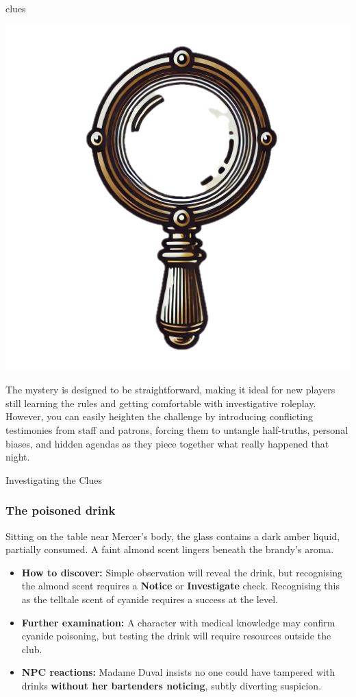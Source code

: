 \newcolumn
{clues}

\begin{center}
	\includegraphics[width=.5\linewidth]{img/separt/detective-glass}
\end{center}

\begin{GmTips}
	The mystery is designed to be straightforward, making it ideal for new players still learning the rules and getting comfortable with investigative roleplay. However, you can easily heighten the challenge by introducing conflicting testimonies from staff and patrons, forcing them to untangle half-truths, personal biases, and hidden agendas as they piece together what really happened that night.
\end{GmTips}

\begin{CommentBox}{Investigating the Clues}
	\subsubsection*{The poisoned drink}
	Sitting on the table near Mercer's body, the glass contains a dark amber liquid, partially consumed. A faint almond scent lingers beneath the brandy's aroma.  
	\begin{itemize}
		\item \textbf{How to discover:} Simple observation will reveal the drink, but recognising the almond scent requires a \Basic \textbf{Notice} or \textbf{Investigate} check. Recognising this as the telltale scent of cyanide requires a success at the \Difficult level.
		\item \textbf{Further examination:} A character with medical knowledge may confirm cyanide poisoning, but testing the drink will require resources outside the club.
		\item \textbf{NPC reactions:} Madame Duval insists no one could have tampered with drinks \textbf{without her bartenders noticing}, subtly diverting suspicion.
	\end{itemize}
\end{CommentBox}	

